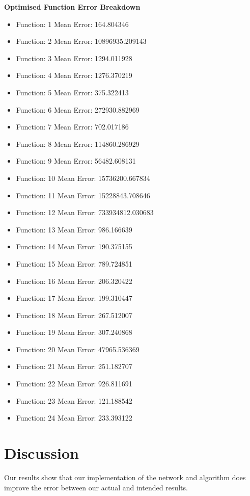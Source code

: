 \documentclass[12pt]{article}
\begin{document}
\textbf{Optimised Function Error Breakdown}
\begin{itemize}
	\item Function:  1  Mean Error: 164.804346
	\item Function:  2  Mean Error: 10896935.209143
	\item Function:  3  Mean Error: 1294.011928
	\item Function:  4  Mean Error: 1276.370219
	\item Function:  5  Mean Error: 375.322413	
	\item Function:  6  Mean Error: 272930.882969
	\item Function:  7  Mean Error: 702.017186
	\item Function:  8  Mean Error: 114860.286929
	\item Function:  9  Mean Error: 56482.608131
	\item Function: 10  Mean Error: 15736200.667834
	\item Function: 11  Mean Error: 15228843.708646
	\item Function: 12  Mean Error: 733934812.030683
	\item Function: 13  Mean Error: 986.166639
	\item Function: 14  Mean Error: 190.375155
	\item Function: 15  Mean Error: 789.724851
	\item Function: 16  Mean Error: 206.320422
	\item Function: 17  Mean Error: 199.310447
	\item Function: 18  Mean Error: 267.512007
	\item Function: 19  Mean Error: 307.240868
	\item Function: 20  Mean Error: 47965.536369
	\item Function: 21  Mean Error: 251.182707
	\item Function: 22  Mean Error: 926.811691
	\item Function: 23  Mean Error: 121.188542	
	\item Function: 24  Mean Error: 233.393122
\end{itemize}

\newpage
\section{Discussion}
Our results show that our implementation of the network and algorithm does improve the error between our actual and intended results. 
\end{document}
